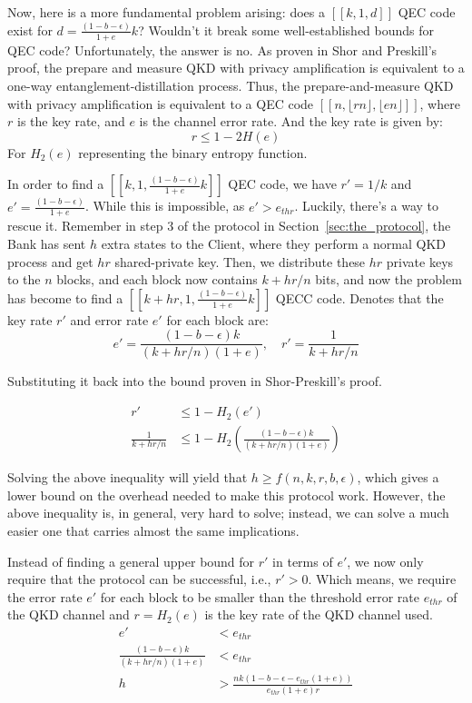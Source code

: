 \documentclass[%
 reprint,
superscriptaddress,
 amsmath,amssymb,
 aps,
]{revtex4-2}
\begin{document}
Now, here is a more fundamental problem arising: does a $[[k, 1, d]]$ QEC code exist for $d=\frac{(1-b-\epsilon)}{1+e}k$? Wouldn't it break some well-established bounds for QEC code? Unfortunately, the answer is no. As proven in Shor and Preskill's proof, the prepare and measure QKD with privacy amplification is equivalent to a one-way entanglement-distillation process. Thus, the prepare-and-measure QKD with privacy amplification is equivalent to a QEC code $[[n, \lfloor rn\rfloor, \lfloor en\rfloor]]$, where $r$ is the key rate, and $e$ is the channel error rate. And the key rate is given by:
\begin{equation}
    r\le 1-2H(e)
\end{equation}
For $H_2(e)$ representing the binary entropy function.

In order to find a $[[k, 1,\frac{(1-b-\epsilon)}{1+e}k]]$ QEC code, we have $r'=1/k$ and $e'=\frac{(1-b-\epsilon)}{1+e}$. While this is impossible, as $e'>e_{thr}$. Luckily, there's a way to rescue it. Remember in step 3 of the protocol in Section~\ref{sec:the_protocol}, the Bank has sent $h$ extra states to the Client, where they perform a normal QKD process and get $hr$ shared-private key. Then, we distribute these $hr$ private keys to the $n$ blocks, and each block now contains $k+hr/n$ bits, and now the problem has become to find a $[[k+hr, 1, \frac{(1-b-\epsilon)}{1+e}k]]$ QECC code. Denotes that the key rate $r'$ and error rate $e'$ for each block are:
\begin{equation}
    e'=\frac{(1-b-\epsilon)k}{(k+hr/n)(1+e)}, \quad r'=\frac{1}{k+hr/n}
\end{equation}

Substituting it back into the bound proven in Shor-Preskill's proof.

\begin{equation}
\begin{split}
    r'&\le1-H_2(e')\\
    \frac{1}{k+hr/n}&\le1-H_2\left(\frac{(1-b-\epsilon)k}{(k+hr/n)(1+e)}\right)
\end{split}
\end{equation}

Solving the above inequality will yield that $h\ge f(n, k, r, b,\epsilon)$, which gives a lower bound on the overhead needed to make this protocol work. However, the above inequality is, in general, very hard to solve; instead, we can solve a much easier one that carries almost the same implications.

Instead of finding a general upper bound for $r'$ in terms of $e'$, we now only require that the protocol can be successful, i.e., $r'>0$. Which means, we require the error rate $e'$ for each block to be smaller than the threshold error rate $e_{thr}$ of the QKD channel and $r=H_2(e)$ is the key rate of the QKD channel used.
\begin{equation}
\begin{split}
    e'&< e_{thr}\\
    \frac{(1-b-\epsilon)k}{(k+hr/n)(1+e)}&< e_{thr}\\
    h&>\frac{nk(1-b-\epsilon-e_{thr}(1+e))}{e_{thr}(1+e)r}
\end{split}
\label{eq:lower_bound_h}
\end{equation}
\end{document}
